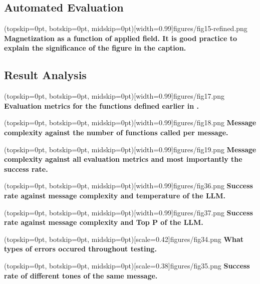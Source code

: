 \documentclass{ieeeaccess}
\begin{document}
\subsection{Automated Evaluation}
\Figure[t!](topskip=0pt, botskip=0pt, midskip=0pt)[width=0.99\columnwidth]{{figures/fig15-refined.png}}
{ \textbf{Magnetization as a function of applied field.
It is good practice to explain the significance of the figure in the caption.}\label{fig6}}
\subsection{Result Analysis}

\Figure[t!](topskip=0pt, botskip=0pt,
midskip=0pt)[width=0.99\columnwidth]{{figures/fig17.png}}
{ \textbf{Evaluation metrics for the functions defined earlier in .}\label{fig7}}

\Figure[t!](topskip=0pt, botskip=0pt,
midskip=0pt)[width=0.99\columnwidth]{{figures/fig18.png}}
{ \textbf{Message complexity against the number of functions called per message.}\label{fig8}}

\Figure[t!](topskip=0pt, botskip=0pt,
midskip=0pt)[width=0.99\columnwidth]{{figures/fig19.png}}
{ \textbf{Message complexity against all evaluation metrics and most importantly the success rate.}\label{fig9}}



\Figure[t!](topskip=0pt, botskip=0pt,
midskip=0pt)[width=0.99\columnwidth]{{figures/fig36.png}}
{ \textbf{Success rate against message complexity and temperature of the LLM.}\label{fig10}}

\Figure[t!](topskip=0pt, botskip=0pt,
midskip=0pt)[width=0.99\columnwidth]{{figures/fig37.png}}
{ \textbf{Success rate against message complexity and Top P of the LLM.}\label{fig11}}

\Figure[t!](topskip=0pt, botskip=0pt,
midskip=0pt)[scale=0.42]{{figures/fig34.png}}
{ \textbf{What types of errors occured throughout testing.}\label{fig12}}

\Figure[t!](topskip=0pt, botskip=0pt,
midskip=0pt)[scale=0.38]{{figures/fig35.png}}
{ \textbf{Success rate of different tones of the same message.}\label{fig13}}
\end{document}
